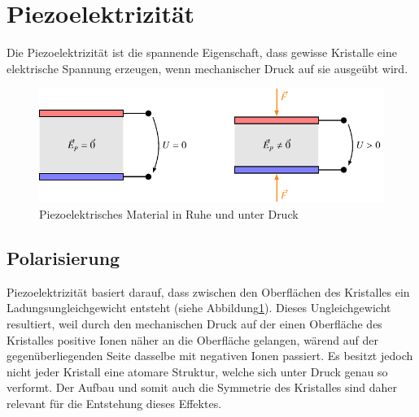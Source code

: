 \section{Piezoelektrizität}
Die Piezoelektrizität ist die spannende Eigenschaft, dass gewisse Kristalle eine elektrische Spannung erzeugen, wenn mechanischer Druck auf sie ausgeübt wird.

\begin{figure}
    \centering
    \includegraphics[]{papers/punktgruppen/figures/piezo} %
    \caption{Piezoelektrisches Material in Ruhe und unter Druck}
    \label{fig:punktgruppen:basicPiezo}
\end{figure}

\subsection{Polarisierung}

Piezoelektrizität basiert darauf, dass zwischen den Oberflächen des Kristalles ein Ladungsungleichgewicht entsteht (siehe Abbildung\ref{fig:punktgruppen:basicPiezo}).
Dieses Ungleichgewicht resultiert, weil durch den mechanischen Druck auf der einen Oberfläche des Kristalles positive Ionen näher an die Oberfläche gelangen, wärend auf der gegenüberliegenden Seite dasselbe mit negativen Ionen passiert.
Es besitzt jedoch nicht jeder Kristall eine atomare Struktur, welche sich unter Druck genau so verformt.
Der Aufbau und somit auch die Symmetrie des Kristalles sind daher relevant für die Entstehung dieses Effektes.


